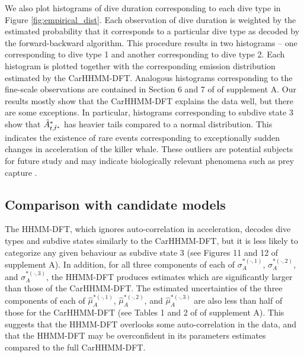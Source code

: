 We also plot histograms of dive duration corresponding to each dive type in Figure \ref{fig:empirical_dist}. Each observation of dive duration is weighted by the estimated probability that it corresponds to a particular dive type as decoded by the %
forward-backward algorithm. This procedure results in two histograms -- one corresponding to dive type 1 and another corresponding to dive type 2. Each histogram is plotted together with the corresponding emission distribution estimated by the CarHHMM-DFT. Analogous histograms corresponding to the fine-scale observations are contained in Section 6 and 7 of of supplement A. Our results mostly show that the CarHHMM-DFT explains the data well, but there are some exceptions. In particular, histograms corresponding to subdive state 3 show that $\tilde{A}^*_{t,\tilde t^*}$ has heavier tails compared to a normal distribution. This indicates the existence of rare events corresponding to exceptionally sudden changes in acceleration of the killer whale. These outliers are potential subjects for future study and may indicate biologically relevant phenomena such as prey capture \citep{Tennessen:2019a}.

\subsection{Comparison with candidate models}

The HHMM-DFT, which ignores auto-correlation in acceleration, decodes dive types and subdive states similarly to the CarHHMM-DFT, but it is less likely to categorize 
any given behaviour as subdive state 3
(see Figures 11 and 12 of supplement A). In addition, for all three components of each of $\sigma_A^{*(\cdot,1)}$, $\sigma_A^{*(\cdot,2)}$, and $\sigma_A^{*(\cdot,3)}$, the HHMM-DFT produces estimates which are %
significantly larger than those of the CarHHMM-DFT. The estimated uncertainties of the three components of each of $\hat \mu_A^{*(\cdot,1)}$, $\hat \mu_A^{*(\cdot,2)}$, and $\hat \mu_A^{*(\cdot,3)}$ are also less than half of those for the CarHHMM-DFT (see Tables 1 and 2 of of supplement A). This suggests %
that the HHMM-DFT overlooks some auto-correlation in the data, and that the HHMM-DFT may be overconfident in its parameters estimates compared to the full CarHHMM-DFT.


